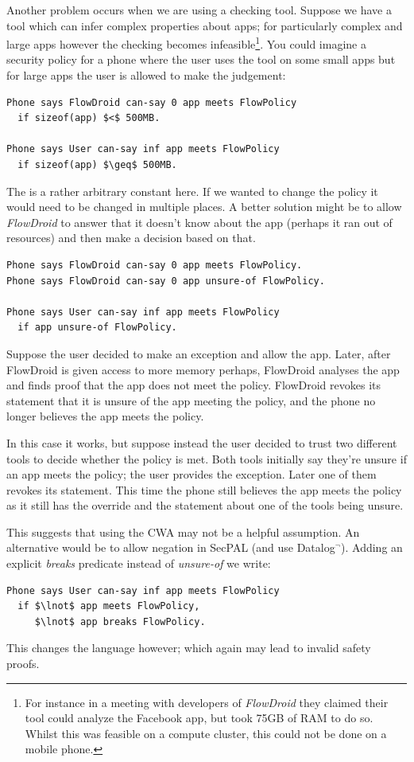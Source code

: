 \documentclass[a4paper]{article}
\begin{document}
Another problem occurs when we are using a checking tool.  Suppose we have a
tool which can infer complex properties about apps; for particularly complex and
large apps however the checking becomes infeasible\footnote{For instance in a
  meeting with developers of \emph{FlowDroid} they claimed their tool could
  analyze the Facebook app, but took 75GB of RAM to do so. Whilst this was
  feasible on a compute cluster, this could not be done on a mobile phone.}. You
could imagine a security policy for a phone where the user uses the tool on some
small apps but for large apps the user is allowed to make the judgement:
\begin{lstlisting}[language=SecPAL,mathescape=true]
Phone says FlowDroid can-say 0 app meets FlowPolicy
  if sizeof(app) $<$ 500MB.

Phone says User can-say inf app meets FlowPolicy
  if sizeof(app) $\geq$ 500MB.
\end{lstlisting}
The  is a rather arbitrary constant here. If we wanted to change the
policy it would need to be changed in multiple places.  A better solution might
be to allow \emph{FlowDroid} to answer that it doesn't know about the app
(perhaps it ran out of resources) and then make a decision based on that.
\begin{lstlisting}[language=SecPAL]
Phone says FlowDroid can-say 0 app meets FlowPolicy.
Phone says FlowDroid can-say 0 app unsure-of FlowPolicy.

Phone says User can-say inf app meets FlowPolicy
  if app unsure-of FlowPolicy.
\end{lstlisting}

Suppose the user decided to make an exception and allow the app.
Later, after FlowDroid is given access to more memory perhaps, FlowDroid
analyses the app and finds proof that the app does not meet the policy.
FlowDroid revokes its statement that it is unsure of the app meeting the policy,
and the phone no longer believes the app meets the policy.

In this case it works, but suppose instead the user decided to trust two
different tools to decide whether the policy is met.  Both tools initially say
they're unsure if an app meets the policy; the user provides the exception.
Later one of them revokes its statement.  This time the phone still believes the
app meets the policy as it still has the override and the statement about one of
the tools being unsure.

This suggests that using the \ac{CWA} may not be a helpful assumption. An alternative
would be to allow negation in SecPAL (and use Datalog$^\lnot$).  Adding an
explicit \emph{breaks} predicate instead of \emph{unsure-of} we write:
\begin{lstlisting}[language=SecPAL, mathescape=true]
Phone says User can-say inf app meets FlowPolicy
  if $\lnot$ app meets FlowPolicy,
     $\lnot$ app breaks FlowPolicy.
\end{lstlisting}
This changes the language however; which again may lead to invalid safety
proofs. 
\end{document}
